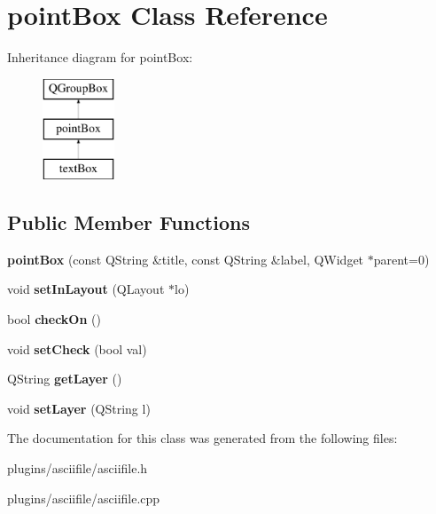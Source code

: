 \hypertarget{classpointBox}{\section{point\-Box Class Reference}
\label{classpointBox}
}
Inheritance diagram for point\-Box\-:\begin{figure}[H]
\begin{center}
\leavevmode
\includegraphics[height=3.000000cm]{classpointBox}
\end{center}
\end{figure}
\subsection*{Public Member Functions}
\begin{DoxyCompactItemize}
\item 
\hypertarget{classpointBox_a9de65d6ae28ad891dca25f79784b3d86}{{\bfseries point\-Box} (const Q\-String \&title, const Q\-String \&label, Q\-Widget $\ast$parent=0)}\label{classpointBox_a9de65d6ae28ad891dca25f79784b3d86}

\item 
\hypertarget{classpointBox_a73b896cc2e27ac0ab17785cb7379147b}{void {\bfseries set\-In\-Layout} (Q\-Layout $\ast$lo)}\label{classpointBox_a73b896cc2e27ac0ab17785cb7379147b}

\item 
\hypertarget{classpointBox_a0d99fc78ef8637d33ae2177bce2ee079}{bool {\bfseries check\-On} ()}\label{classpointBox_a0d99fc78ef8637d33ae2177bce2ee079}

\item 
\hypertarget{classpointBox_aa73e53421382d954f81c26ce4c875195}{void {\bfseries set\-Check} (bool val)}\label{classpointBox_aa73e53421382d954f81c26ce4c875195}

\item 
\hypertarget{classpointBox_af954402379bff07a964425d6ab648d0a}{Q\-String {\bfseries get\-Layer} ()}\label{classpointBox_af954402379bff07a964425d6ab648d0a}

\item 
\hypertarget{classpointBox_ab0f40fd40085ef1df159af794b27d9c4}{void {\bfseries set\-Layer} (Q\-String l)}\label{classpointBox_ab0f40fd40085ef1df159af794b27d9c4}

\end{DoxyCompactItemize}


The documentation for this class was generated from the following files\-:\begin{DoxyCompactItemize}
\item 
plugins/asciifile/asciifile.\-h\item 
plugins/asciifile/asciifile.\-cpp\end{DoxyCompactItemize}
